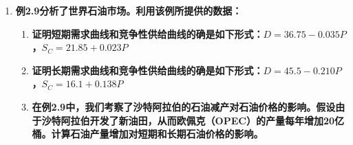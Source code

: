 \begin{enumerate}[label=\textbf{\arabic*.}, leftmargin=*]
			\textbf{答：}
			
			\textbf{a.} 当铜的需求整体增加 $20\%$ 时，意味着在任意既定价格下，新需求量变为原需求量的 $1.2$ 倍。推导新需求曲线如下：
				$$ Q_D' = 1.2 \times (27 - 3P) = 32.4 - 3.6P $$
			在短期供给曲线不变（$Q_S = -9 + 9P$）的情况下，联立新的供需方程求解新均衡价格 $P'$：
			$$ \begin{aligned}
				32.4 - 3.6P &= -9 + 9P \\
				P' &\approx 3.29 \text{ 美元/磅}
			\end{aligned} $$
			由此可见，需求增加 $20\%$ 会导致铜的均衡价格从 $3$ 美元上涨至约 $3.29$ 美元/磅。
			
			\vspace{1em}
			\textbf{b.} 将求得的新均衡价格 $P' \approx 3.29$ 代入供给曲线，计算新的均衡数量 $Q'$：
			$$ Q' = -9 + 9 \times 3.29 \approx 20.61 \text{ 百万公吨/年} $$
			均衡数量的变动量为 $\Delta Q = 20.61 - 18 = 2.61 \text{ 百万公吨/年}$。这意味着均衡产量较初始水平提升了约 $14.5\%$。
			
			\vspace{1em}
			\textbf{c.} 当铜的供给整体下降 $20\%$ 时，新的供给量变为原供给量的 $0.8$ 倍。推导新供给曲线如下：
			
				$$ Q_S' = 0.8 \times (-9 + 9P) = -7.2 + 7.2P $$
				
			结合 a 问中右移的新需求曲线 $Q_D' = 32.4 - 3.6P$，再次联立求解全新的市场均衡：
			$$ \begin{aligned}
				32.4 - 3.6P &= -7.2 + 7.2P \\
				P'' &\approx 3.67 \text{ 美元/磅}
			\end{aligned} $$
			将 $P''$ 代入新供给曲线求均衡数量：
			$$ Q'' = -7.2 + 7.2 \times 3.67 \approx 19.22 \text{ 百万公吨/年} $$
			结论：在需求增加 $20\%$ 且供给减少 $20\%$ 的双重冲击下，铜的供不应求状况加剧，均衡价格将进一步推高至约 $3.67$ 美元/磅，而均衡产量变为约 $19.22$ 百万公吨/年。
			
			\newpage
			
			\item \textbf{例2.9分析了世界石油市场。利用该例所提供的数据：}
			\begin{enumerate}[label=\textbf{\alph*.}, leftmargin=2em]
				\item \textbf{证明短期需求曲线和竞争性供给曲线的确是如下形式：$D = 36.75 - 0.035P$，$S_C = 21.85 + 0.023P$}
				\item \textbf{证明长期需求曲线和竞争性供给曲线的确是如下形式：$D = 45.5 - 0.210P$，$S_C = 16.1 + 0.138P$}
				\item \textbf{在例2.9中，我们考察了沙特阿拉伯的石油减产对石油价格的影响。假设由于沙特阿拉伯开发了新油田，从而欧佩克（OPEC）的产量每年增加20亿桶。计算石油产量增加对短期和长期石油价格的影响。}
			\end{enumerate}
			

\end{enumerate}
